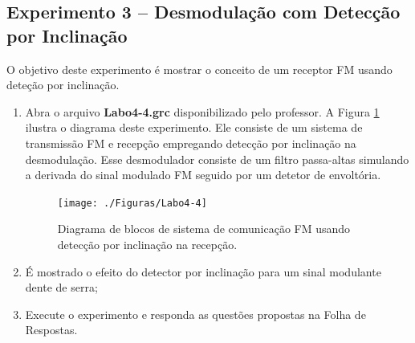 \documentclass[12pt,addpoints]{exam}
\begin{document}
%

\subsection{Experimento 3 -- Desmodulação com Detecção por Inclinação}

O objetivo deste experimento é mostrar o conceito de um receptor FM usando deteção por inclinação.

\begin{enumerate}
    \item  Abra o arquivo \textbf{Labo4-4.grc} disponibilizado pelo professor. A Figura \ref{fig:GRC_4-4} ilustra o diagrama deste experimento. Ele consiste de um sistema de transmissão FM e recepção empregando detecção por inclinação na desmodulação. Esse desmodulador consiste de um filtro passa-altas simulando a derivada do sinal modulado FM seguido por um detetor de envoltória.
    \begin{figure}[htb]
        \centering
        \texttt{[image: ./Figuras/Labo4-4]}
        \caption{Diagrama de blocos de sistema de comunicação FM usando detecção por inclinação na recepção.} 
        \label{fig:GRC_4-4}
    \end{figure}
  \item É mostrado o efeito do detector por inclinação para um sinal modulante dente de serra;
  \item Execute o experimento e responda as questões propostas na Folha de Respostas.
\end{enumerate}
\end{document}
